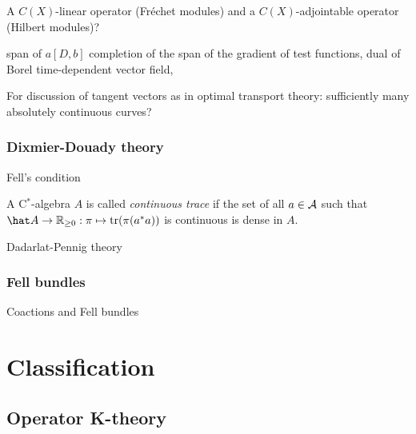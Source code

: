 \documentclass{../../large}
\begin{document}
A $C(X)$-linear operator (Fr\'echet modules) and a $C(X)$-adjointable operator (Hilbert modules)?


span of $a[D,b]$
completion of the span of the gradient of test functions,
dual of Borel time-dependent vector field,

For discussion of tangent vectors as in optimal transport theory:
sufficiently many absolutely continuous curves?




\section{Dixmier-Douady theory}

\begin{prb}
	
\end{prb}


Fell's condition

A C$^*$-algebra $A$ is called \emph{continuous trace} if the set of all $a\in\mathcal{A}$ such that $\hat A\to\R_{\ge0}:\pi\mapsto\tr(\pi(a^*a))$ is continuous is dense in $A$.



Dadarlat-Pennig theory







\section{Fell bundles}



Coactions and Fell bundles



























\part{Classification}
\chapter{Operator K-theory}
\end{document}
